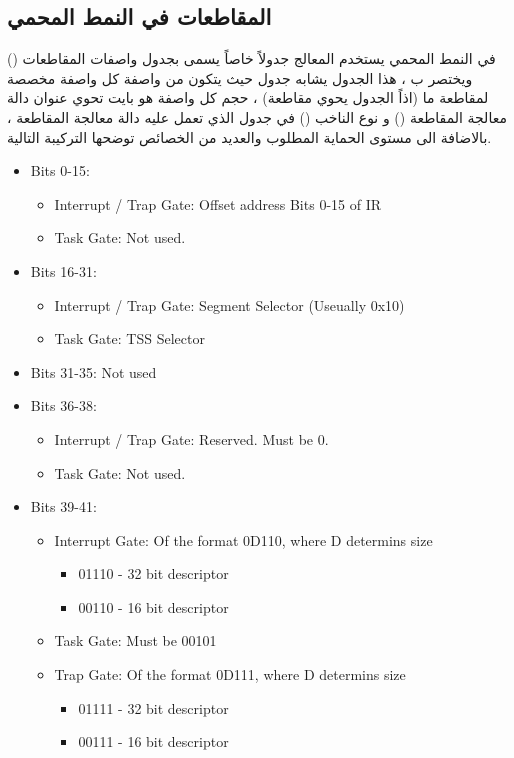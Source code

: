 \documentclass[document.tex]{subfiles}
\begin{document}
\subsection{المقاطعات في النمط المحمي}
في النمط المحمي يستخدم المعالج جدولاً خاصاً يسمى بجدول واصفات المقاطعات () ويختصر ب  ، هذا الجدول يشابه جدول  حيث يتكون من  واصفة كل واصفة مخصصة لمقاطعة ما (اذاً الجدول يحوي  مقاطعة) ، حجم كل واصفة هو  بايت  تحوي عنوان دالة معالجة المقاطعة () و نوع الناخب () في جدول   الذي تعمل عليه دالة معالجة المقاطعة ، بالاضافة الى مستوى الحماية المطلوب والعديد من الخصائص توضحها التركيبة التالية.

\begin{english}

\begin{itemize}
\item Bits 0-15:
\begin{itemize}
\item Interrupt / Trap Gate: Offset address Bits 0-15 of IR
\item Task Gate: Not used. 
\end{itemize}

\item Bits 16-31:
\begin{itemize}
\item Interrupt / Trap Gate: Segment Selector (Useually 0x10)
\item Task Gate: TSS Selector
\end{itemize}

\item Bits 31-35: Not used
\item Bits 36-38:
\begin{itemize}
\item Interrupt / Trap Gate: Reserved. Must be 0.
\item Task Gate: Not used.
\end{itemize}

\item Bits 39-41:
\begin{itemize}
\item Interrupt Gate: Of the format 0D110, where D determins size
\begin{itemize}
\item 01110 - 32 bit descriptor
\item 00110 - 16 bit descriptor
\end{itemize}
\item Task Gate: Must be 00101
\item Trap Gate: Of the format 0D111, where D determins size
\begin{itemize}
\item 01111 - 32 bit descriptor
\item 00111 - 16 bit descriptor
\end{itemize}


\end{itemize}
\end{itemize}
\end{english}
\end{document}
